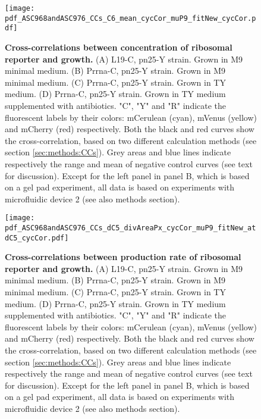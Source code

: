 \begin{figure}
    \centering
    \texttt{[image: pdf\_ASC968andASC976\_CCs\_C6\_mean\_cycCor\_muP9\_fitNew\_cycCor.pdf]}
    \caption{ 
        \textbf{Cross-correlations between concentration of ribosomal reporter and growth.}
        (A) L19-C, pn25-Y strain. Grown in M9 minimal medium.
        (B) Prrna-C, pn25-Y strain. Grown in M9 minimal medium.        
        (C) Prrna-C, pn25-Y strain. Grown in TY medium.
        (D) Prrna-C, pn25-Y strain. Grown in TY medium supplemented with antibiotics.
        "C", "Y" and "R" indicate the fluorescent labels by their colors: mCerulean (cyan), mVenus (yellow) and mCherry (red) respectively.
        Both the black and red curves show the cross-correlation, based on two different calculation methods (see section \ref{sec:methods:CCs}).
        Grey areas and blue lines indicate respectively the range and mean of negative control curves (see text for discussion).
        Except for the left panel in panel B, which is based on a gel pad experiment, all data is based on experiments with microfluidic device 2 (see also methods section).
    }
    \label{fig:ribo:CCsEmuYRibo}
\end{figure}

\begin{figure}
    \centering
    \texttt{[image: pdf\_ASC968andASC976\_CCs\_dC5\_divAreaPx\_cycCor\_muP9\_fitNew\_atdC5\_cycCor.pdf]}
    \caption{ 
        \textbf{Cross-correlations between production rate of ribosomal reporter and growth.}
        (A) L19-C, pn25-Y strain. Grown in M9 minimal medium.
        (B) Prrna-C, pn25-Y strain. Grown in M9 minimal medium.        
        (C) Prrna-C, pn25-Y strain. Grown in TY medium.
        (D) Prrna-C, pn25-Y strain. Grown in TY medium supplemented with antibiotics.
        "C", "Y" and "R" indicate the fluorescent labels by their colors: mCerulean (cyan), mVenus (yellow) and mCherry (red) respectively.
        Both the black and red curves show the cross-correlation, based on two different calculation methods (see section \ref{sec:methods:CCs}).
        Grey areas and blue lines indicate respectively the range and mean of negative control curves (see text for discussion).
        Except for the left panel in panel B, which is based on a gel pad experiment, all data is based on experiments with microfluidic device 2 (see also methods section).
    }
    \label{fig:ribo:CCsPmuYRibo}
\end{figure}


